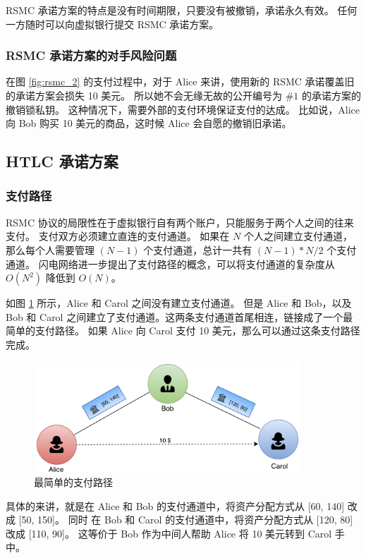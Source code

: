 RSMC 承诺方案的特点是没有时间期限，只要没有被撤销，承诺永久有效。
任何一方随时可以向虚拟银行提交 RSMC 承诺方案。

\subsubsection{RSMC 承诺方案的对手风险问题}
在图 \ref{fig:rsmc_2} 的支付过程中，对于 Alice 来讲，使用新的 RSMC 承诺覆盖旧的承诺方案会损失 10 美元。
所以她不会无缘无故的公开编号为 $\#1$ 的承诺方案的撤销锁私钥。
这种情况下，需要外部的支付环境保证支付的达成。
比如说，Alice 向 Bob 购买 10 美元的商品，这时候 Alice 会自愿的撤销旧承诺。

\subsection{HTLC 承诺方案}\label{sec:htlc}
\subsubsection{支付路径}
RSMC 协议的局限性在于虚拟银行自有两个账户，只能服务于两个人之间的往来支付。
支付双方必须建立直连的支付通道。
如果在 $N$ 个人之间建立支付通道，那么每个人需要管理 $(N-1)$ 个支付通道，总计一共有 $(N - 1)*N/2$  个支付通道。
闪电网络进一步提出了支付路径的概念，可以将支付通道的复杂度从 $O(N^2)$ 降低到 $O(N)$。

如图 \ref{fig:alice_bob_carol} 所示，Alice 和 Carol 之间没有建立支付通道。
但是 Alice 和 Bob，以及 Bob 和 Carol 之间建立了支付通道。这两条支付通道首尾相连，链接成了一个最简单的支付路径。
如果 Alice 向 Carol 支付 10 美元，那么可以通过这条支付路径完成。

\begin{figure}[h!]
    \centering
    \includegraphics[width=10cm, keepaspectratio]{../images/channels_1.png}
    \caption{最简单的支付路径}
    \label{fig:alice_bob_carol}
\end{figure}

具体的来讲，就是在 Alice 和 Bob 的支付通道中，将资产分配方式从 [60, 140] 改成 [50, 150]。
同时 在 Bob 和 Carol 的支付通道中，将资产分配方式从 [120, 80] 改成 [110, 90]。
这等价于 Bob 作为中间人帮助 Alice 将 10 美元转到 Carol 手中。

